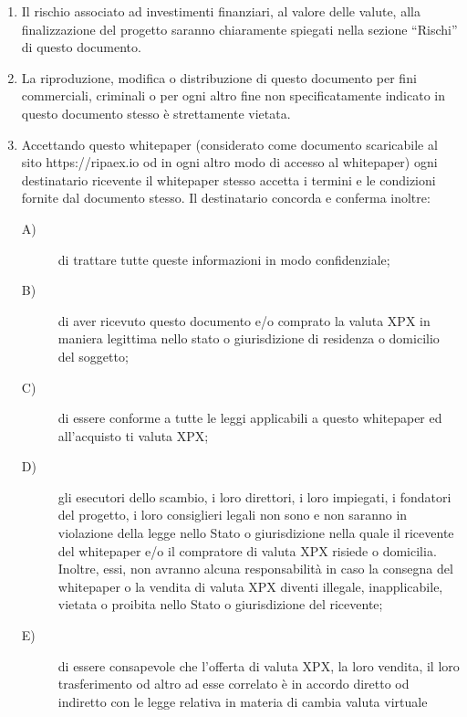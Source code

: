 \documentclass[11pt,fleqn]{book} %
\begin{document}
\begin{scriptsize}
{\begin{enumerate}
			usando come esempio la legge europea che governa la pubblicazione di testi e documenti nel momento di scrittura.
			Questa documentazione potrebbe non essere conforme alla legge dello stato da cui gli INVESTITORI provengono,
			in tale caso un avvocato deve essere consultato per ottenere informazioni aggiuntive in riguardo la legalità
			di RIPA TEC e le leggi internazionali alla quali RIPA TEC deve essere sottomessa una volta lanciata.
			\item Il rischio associato ad investimenti finanziari, al valore delle valute, alla finalizzazione del progetto
			saranno chiaramente spiegati nella sezione ``Rischi'' di questo documento.
			\item La riproduzione, modifica o distribuzione di questo documento per fini commerciali, criminali o per ogni
			altro fine non specificatamente indicato in questo documento stesso è strettamente vietata.
			\item Accettando questo whitepaper (considerato come documento scaricabile al sito https://ripaex.io od in
			ogni altro modo di accesso al whitepaper) ogni destinatario ricevente il whitepaper stesso accetta i termini
			e le condizioni fornite dal documento stesso.
			Il destinatario concorda e conferma inoltre:
			\begin{description}
				\item[A)] di trattare tutte queste informazioni in modo confidenziale;
				\item[B)] di aver ricevuto questo documento e/o comprato la valuta XPX in maniera legittima nello stato o 
				giurisdizione di residenza o domicilio del soggetto; 
				\item[C)] di essere conforme a tutte le leggi applicabili a questo whitepaper ed all'acquisto ti valuta XPX; 
				\item[D)] gli esecutori dello scambio, i loro direttori, i loro impiegati, i fondatori del progetto, i loro
				consiglieri legali non sono e non saranno in violazione della legge nello Stato o giurisdizione nella quale
				il ricevente del whitepaper e/o il compratore di valuta XPX risiede o domicilia. Inoltre, essi, non avranno
				alcuna responsabilità in caso la consegna del whitepaper o la vendita di valuta XPX diventi illegale, 
				inapplicabile, vietata o proibita nello Stato o giurisdizione del ricevente;
				\item[E)] di essere consapevole che l'offerta di valuta XPX, la loro vendita, il loro trasferimento od altro
				ad esse correlato è in accordo diretto od indiretto con le legge relativa in materia di cambia valuta virtuale

\end{description}
\end{enumerate}}
\end{scriptsize}
\end{document}

